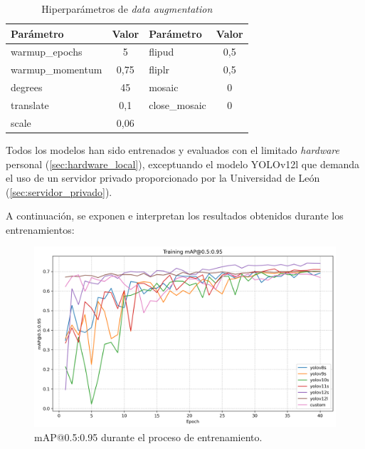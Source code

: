\documentclass[12pt,a4paper,onecolumn,oneside]{report}
\begin{document}
\begin{table}[H]
\caption{Hiperparámetros de \textit{data augmentation}}
\label{tab:Hiperparámetros de data augmentation}
\centering
\begin{tabular}{lc|lc}
\toprule
\textbf{Parámetro} & \textbf{Valor} & \textbf{Parámetro} & \textbf{Valor} \\
\midrule
warmup\_epochs & 5 & flipud & 0,5 \\
warmup\_momentum & 0,75 & fliplr & 0,5 \\
degrees & 45 & mosaic & 0 \\
translate & 0,1 & close\_mosaic & 0 \\
scale & 0,06 & & \\
\bottomrule
\end{tabular}
\end{table}

Todos los modelos han sido entrenados y evaluados con el limitado \textit{hardware} personal (\autoref{sec:hardware_local}), exceptuando el modelo YOLOv12l que demanda el uso de un servidor privado 
proporcionado por la Universidad de León (\autoref{sec:servidor_privado}).

A continuación, se exponen e interpretan los resultados obtenidos durante los entrenamientos:

\begin{figure}[H]
  \centering
  \includegraphics[width=1.0\textwidth]{figuras/YOLO_plots/map50-95.png}
  \caption{mAP@0.5:0.95 durante el proceso de entrenamiento.}
  \label{fig:yolo_train_map95}
\end{figure}
\end{document}
